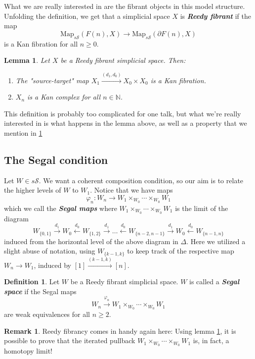 \documentclass{article}
\newcommand{\textbi}[1]{\textbf{\textit{#1}}}
\newcommand{\bN}{\mathbb{N}}
\newcommand{\cS}{\mathcal{S}}
\newcommand{\sS}{s\cS}
\newcommand{\Map}{\mathrm{Map}}
\newtheorem{lem}[subsection]{Lemma}
\theoremstyle{definition}
\newtheorem{defin}[subsection]{Definition}
\newtheorem{rem}[subsection]{Remark}
\begin{document}
What we are really interested in are the fibrant objects in this model structure. Unfolding the definition, we get that a simplicial space $X$ is \textbi{Reedy fibrant} if the map $$\Map_{\sS}(F(n),X)\to\Map_{\sS}(\partial F(n), X)$$ is a Kan fibration for all $n\geq 0$. 

\begin{lem}\label{refib}
    Let $X$ be a Reedy fibrant simplicial space. Then:
    \begin{enumerate}
        \item The "source-target" map $X_1\xrightarrow{(d_1,d_0)}X_0\times X_0$ is a Kan fibration.
        \item $X_n$ is a Kan complex for all $n\in \bN$.
    \end{enumerate}
\end{lem}

This definition is probably too complicated for one talk, but what we're really interested in is what happens in the lemma above, as well as a property that we mention in \ref{reedy}

\subsection*{The Segal condition}

Let $W\in\sS$. We want a coherent composition condition, so our aim is to relate the higher levels of $W$ to $W_1$. 
Notice that we have maps
$$\varphi_n : W_n\to W_1\times_{W_0}\cdots\times_{W_0}W_1$$ which we call the \textbi{Segal maps}
where $W_1\times_{W_0}\cdots\times_{W_0}W_1$ is the limit of the diagram
$$W_{\{0,1\}}\xrightarrow{d_1}W_0\xleftarrow{d_0}W_{\{1,2\}}\xrightarrow{d_1}\dots \xleftarrow{d_0}W_{\{n-2,n-1\}}\xrightarrow{d_1}W_0\xleftarrow{d_0}W_{\{n-1,n\}}$$
induced from the horizontal level of the above diagram in $\Delta$.
Here we utilized a slight abuse of notation, using $W_{\{k-1,k\}}$ to keep track of the respective map $W_n\to W_1$, induced by $[1]\xrightarrow{(k-1,k)}[n]$.

\begin{defin}
    Let $W$ be a Reedy fibrant simplicial space. $W$ is called a \textbi{Segal space} if the Segal maps 
    $$W_n\xrightarrow{\varphi_n} W_1\times_{W_0}\cdots\times_{W_0}W_1$$ are weak equivalences for all $n\geq 2$.
\end{defin}

\begin{rem}\label{reedy}
    Reedy fibrancy comes in handy again here: Using lemma \ref{refib}, it is possible to prove that the iterated pullback $W_1\times_{W_0}\cdots\times_{W_0}W_1$ is, in fact, a homotopy limit! 
\end{rem}
\end{document}
